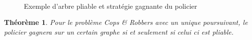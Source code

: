 \documentclass[12pt]{article}
\newtheorem{theoreme}{Théorème}
\newcommand{\cp}{Cops \& Robbers\xspace}
\begin{document}
\begin{figure}[h!]
    \centering
    \begin{subfigure}{}
        
    \end{subfigure}\quad\quad
    \begin{subfigure}{}
        
    \end{subfigure}\quad\quad
    \begin{subfigure}{}
        
    \end{subfigure} \\
    \begin{subfigure}{}
        
    \end{subfigure}\quad\quad
    \begin{subfigure}{}
        
    \end{subfigure}\quad\quad
    \begin{subfigure}{}
        
    \end{subfigure}\quad\quad
    \begin{subfigure}{}
        
    \end{subfigure}\quad\quad
    \label{fig:pliable}
    \caption{Exemple d'arbre pliable et stratégie gagnante du policier}
\end{figure}

\begin{theoreme}
    Pour le problème \cp avec un unique poursuivant, le policier gagnera sur un certain graphe si et seulement si celui ci est pliable.
\end{theoreme}
\end{document}
